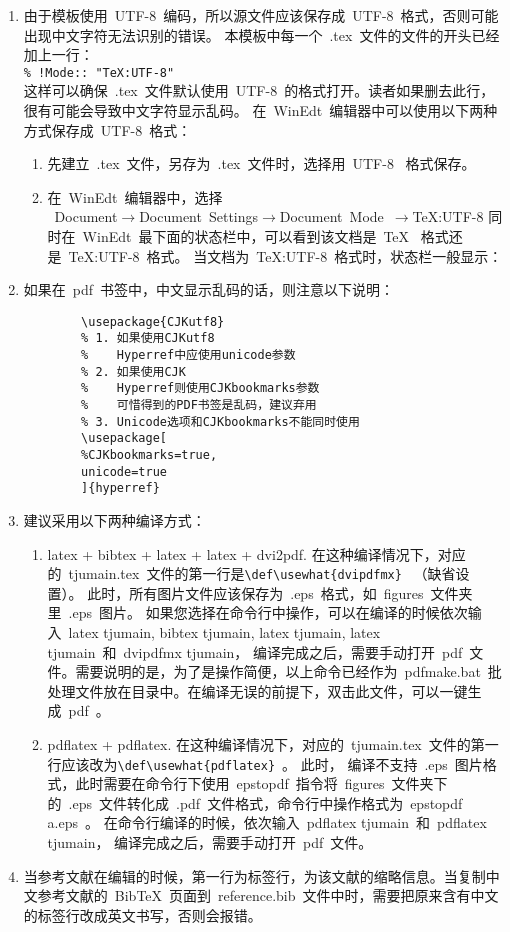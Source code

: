 \begin{enumerate}
  \item 由于模板使用~UTF-8~编码，所以源文件应该保存成~UTF-8~格式，否则可能出现中文字符无法识别的错误。
  本模板中每一个~.tex~文件的文件的开头已经加上一行：\\
  \verb|% !Mode:: "TeX:UTF-8"|\\
     这样可以确保~.tex~文件默认使用~UTF-8~的格式打开。读者如果删去此行，很有可能会导致中文字符显示乱码。
     在~WinEdt~编辑器中可以使用以下两种方式保存成~UTF-8~格式：
      \begin{enumerate}
        \item 先建立~.tex~文件，另存为~.tex~文件时，选择用~UTF-8~ 格式保存。
        \item
            在~WinEdt~编辑器中，选择\\
            \mbox{~Document$\rightarrow$Document Settings$\rightarrow$Document Mode $\rightarrow$TeX:UTF-8} 同时在~WinEdt~最下面的状态栏中，可以看到该文档是~TeX~ 格式还是~TeX:UTF-8~格式。
            当文档为~TeX:UTF-8~格式时，状态栏一般显示：
      \end{enumerate}
  \item 如果在~pdf~书签中，中文显示乱码的话，则注意以下说明：
    \begin{verbatim}
        \usepackage{CJKutf8}
        % 1. 如果使用CJKutf8
        %    Hyperref中应使用unicode参数
        % 2. 如果使用CJK
        %    Hyperref则使用CJKbookmarks参数
        %    可惜得到的PDF书签是乱码，建议弃用
        % 3. Unicode选项和CJKbookmarks不能同时使用
        \usepackage[
        %CJKbookmarks=true,
        unicode=true
        ]{hyperref}
     \end{verbatim}
  \item 建议采用以下两种编译方式：
  \begin{enumerate}
    \item latex + bibtex + latex + latex + dvi2pdf. 在这种编译情况下，对应的~tjumain.tex~文件的第一行是\verb|\def\usewhat{dvipdfmx}|~ （缺省设置）。 此时，所有图片文件应该保存为~.eps~格式，如~figures~文件夹里~.eps~图片。
          如果您选择在命令行中操作，可以在编译的时候依次输入~latex tjumain, bibtex tjumain, latex tjumain, latex tjumain~和~dvipdfmx tjumain， 编译完成之后，需要手动打开~pdf~文件。需要说明的是，为了是操作简便，以上命令已经作为~pdfmake.bat~批处理文件放在目录中。在编译无误的前提下，双击此文件，可以一键生成~pdf~。

    \item pdflatex + pdflatex. 在这种编译情况下，对应的~tjumain.tex~文件的第一行应该改为\verb|\def\usewhat{pdflatex}|~。 此时， 编译不支持~.eps~图片格式，此时需要在命令行下使用~epstopdf~指令将~figures~文件夹下 的~.eps~文件转化成~.pdf~文件格式，命令行中操作格式为~epstopdf a.eps~。
          在命令行编译的时候，依次输入~pdflatex tjumain~和~pdflatex tjumain， 编译完成之后，需要手动打开~pdf~文件。
  \end{enumerate}
    \item  当参考文献在编辑的时候，第一行为标签行，为该文献的缩略信息。当复制中文参考文献的~BibTeX~页面到~reference.bib~文件中时，需要把原来含有中文的标签行改成英文书写，否则会报错。
\end{enumerate}

